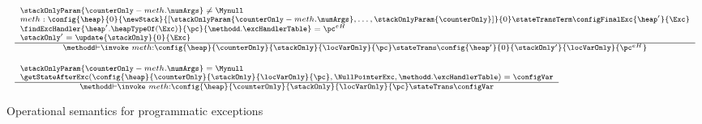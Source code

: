 \begin{figure}[ht!]
\begin{frameit}
$$\begin{array}{l}
	   {\scriptsize \frac{\begin{array}{l}
	                        \stackOnlyParam{ \counterOnly - meth.\numArgs } \neq \Mynull   \\
	                         meth:              \config{\heap}       
                                                       {0}
						       {\newStack }
                                                       {\lbrack \stackOnlyParam{ \counterOnly - meth.\numArgs },\ldots ,\stackOnlyParam{ \counterOnly} \rbrack }
						       {0} 
						         \stateTransTerm 
						       \configFinalExc{\heap'}{\Exc}\\
				            \findExcHandler{\heap'.\heapTypeOf(\Exc)  }{\pc}{\methodd.\excHandlerTable} = \pc^{eH}\\
					    \stackOnly' = \update{\stackOnly}{0}{\Exc}
				\end{array} }	         
	         {\methodd \vdash \invoke \  meth :  \config{\heap}{\counterOnly}{\stackOnly}{\locVarOnly}{\pc} 
		                        \stateTrans  
				\config{\heap'}{0}{\stackOnly'}{\locVarOnly}{\pc^{eH}}	} } \\\\ 
	   {\scriptsize \frac{\begin{array}{l}
	                         \stackOnlyParam{ \counterOnly - meth.\numArgs } = \Mynull   \\ 
				 \getStateAfterExc( \config{\heap}{\counterOnly}{\stackOnly}{\locVarOnly}{\pc},\NullPointerExc,\methodd.\excHandlerTable ) =  \configVar
	         \end{array} 	      
	         }	         
	         {\methodd \vdash \invoke \  meth :  \config{\heap}{\counterOnly}{\stackOnly}{\locVarOnly}{\pc} 
		                        \stateTrans  
					\configVar} } 

 	     					
\end{array}$$
\caption{\sc Operational semantics for programmatic exceptions }
\label{opSem:obj:method}
\end{frameit}
\end{figure}



